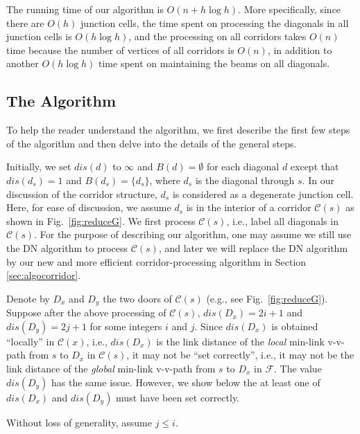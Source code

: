 \documentclass[english,runningheads,11pt]{llncs-revised}
\def\calF{\mathcal{F}}
\def\calC{\mathcal{C}}
\begin{document}
The running time of our algorithm is $O(n+h\log h)$. More specifically, since
there are $O(h)$ junction cells, the time spent on processing the
diagonals in all
junction cells is $O(h\log h)$, and the processing on all corridors
takes $O(n)$ time because the number of vertices of all
corridors is $O(n)$, in addition to another $O(h\log h)$ time spent on
maintaining the beams on all diagonals.

\subsection{The Algorithm}

To help the reader understand the algorithm, we first describe the first few
steps of the algorithm and then delve into the details of the general steps.

Initially, we set $dis(d)$ to $\infty$ and $B(d)=\emptyset$ for each diagonal $d$ except
that $dis(d_s)=1$ and $B(d_s)=\{d_s\}$, where $d_s$ is the diagonal through $s$.
In our discussion of the corridor structure, $d_s$ is
considered as a degenerate junction cell. Here, for ease of
discussion, we assume $d_s$ is in the interior of a corridor $\calC(s)$ as shown
in Fig.~\ref{fig:reduceG}. We first process $\calC(s)$, i.e., label
all diagonals in $\calC(s)$.  For the purpose of describing our algorithm,
one may assume we still use the DN algorithm to process $\calC(s)$,
and later we will replace the DN algorithm by our
new and more efficient corridor-processing algorithm in Section \ref{sec:algocorridor}.


Denote by $D_x$ and $D_y$ the two doors of $\calC(s)$ (e.g., see
Fig.~\ref{fig:reduceG}). Suppose after the above processing of
$\calC(s)$, $dis(D_x)=2i+1$ and $dis(D_y)=2j+1$ for some integers $i$
and $j$.  Since $dis(D_x)$ is obtained ``locally'' in $\calC(x)$,
i.e., $dis(D_x)$ is the link distance of the {\em local} min-link v-v-path from
$s$ to $D_x$ in $\calC(s)$, it may not be ``set correctly'', i.e., it may not be
the link distance of the {\em global} min-link v-v-path from  $s$ to $D_x$ in
$\calF$. The value $dis(D_y)$ has the same issue. However, we show
below the at least one of $dis(D_x)$ and $dis(D_y)$ must have been set
correctly.

Without loss of generality, assume $j\leq i$.
\end{document}
